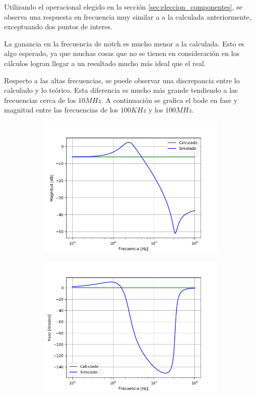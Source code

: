 \documentclass[a4paper]{article}
\begin{document}
Utilizando el operacional elegido en la sección \ref{sec:eleccion_componentes}, se observa una respuesta en frecuencia muy similar a a la calculada anteriormente, exceptuando dos puntos de interes.

La ganancia en la frecuencia de notch es mucho menor a la calculada. Esto es algo esperado, ya que muchas cosas que no se tienen en consideración en los cálculos logran llegar a un resultado mucho más ideal que el real.

Respecto a las altas frecuencias, se puede observar una discrepancia entre lo calculado y lo teórico. Esta diferencia es mucho más grande tendiendo a las frecuencias cerca de los $10MHz$. A continuación se grafica el bode en fase y magnitud entre las frecuencias de los $100KHz$ y los $100MHz$.

\begin{figure}[H]
	\centering
	\begin{subfigure}[t]{0.49\textwidth}
	\hspace*{-2cm}
	\centering
		\includegraphics[width=1.3\textwidth]{Imagenes/bodemag_calc_sim_highf.png}
	\end{subfigure}
	\begin{subfigure}[t]{0.49\textwidth}
	\centering
		\includegraphics[width=1.3\textwidth]{Imagenes/bodefase_calc_sim_highf.png}

\end{subfigure}
\end{figure}
\end{document}
